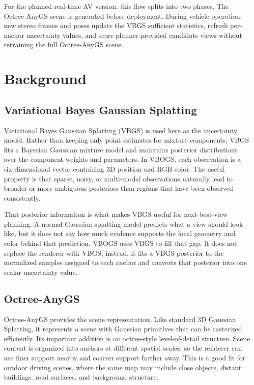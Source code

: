 \documentclass{article}
\begin{document}
For the planned real-time AV version, this flow splits into two phases. The Octree-AnyGS scene is generated before deployment. During vehicle operation, new stereo frames and poses update the VBGS sufficient statistics, refresh per-anchor uncertainty values, and score planner-provided candidate views without retraining the full Octree-AnyGS scene.

\section{Background}
\subsection{Variational Bayes Gaussian Splatting}
Variational Bayes Gaussian Splatting (VBGS) is used here as the uncertainty model. Rather than keeping only point estimates for mixture components, VBGS fits a Bayesian Gaussian mixture model and maintains posterior distributions over the component weights and parameters. In VBOGS, each observation is a six-dimensional vector containing 3D position and RGB color. The useful property is that sparse, noisy, or multi-modal observations naturally lead to broader or more ambiguous posteriors than regions that have been observed consistently.

That posterior information is what makes VBGS useful for next-best-view planning. A normal Gaussian splatting model predicts what a view should look like, but it does not say how much evidence supports the local geometry and color behind that prediction. VBOGS uses VBGS to fill that gap. It does not replace the renderer with VBGS; instead, it fits a VBGS posterior to the normalized samples assigned to each anchor and converts that posterior into one scalar uncertainty value.

\subsection{Octree-AnyGS}
Octree-AnyGS provides the scene representation. Like standard 3D Gaussian Splatting, it represents a scene with Gaussian primitives that can be rasterized efficiently. Its important addition is an octree-style level-of-detail structure. Scene content is organized into anchors at different spatial scales, so the renderer can use finer support nearby and coarser support farther away. This is a good fit for outdoor driving scenes, where the same map may include close objects, distant buildings, road surfaces, and background structure.
\end{document}
